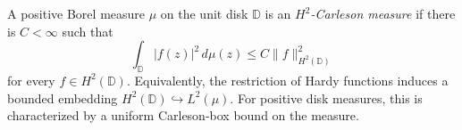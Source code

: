 
A positive Borel measure $\mu$ on the unit disk $\mathbb D$ is an \emph{$H^2$-Carleson measure} if there is $C<\infty$ such that
\[
\int_{\mathbb D}|f(z)|^2\,d\mu(z)\le C\|f\|_{H^2(\mathbb D)}^2
\]
for every $f\in H^2(\mathbb D)$. Equivalently, the restriction of Hardy functions induces a bounded embedding $H^2(\mathbb D)\hookrightarrow L^2(\mu)$. For positive disk measures, this is characterized by a uniform Carleson-box bound on the measure.
